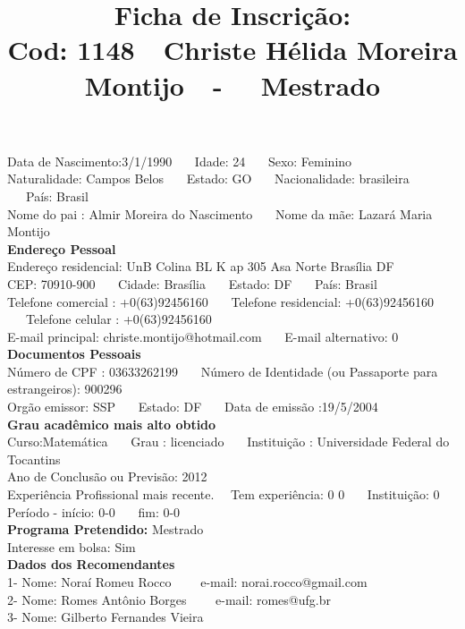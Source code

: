 \documentclass[11pt]{article}
\title{\vspace*{-4cm} Ficha de Inscrição: \\Cod: 1148\ \ Christe Hélida Moreira Montijo\ \ - \ \ Mestrado 
 }
\date{}
\begin{document}
\maketitle
\vspace*{-1.5cm}
\noindent Data de Nascimento:3/1/1990
\ \ \ Idade: 24   \ \ \ Sexo: Feminino
\\
Naturalidade: Campos Belos  
\ \ \  Estado: GO
\ \ \  Nacionalidade: brasileira
\ \ \ País: Brasil
\\        
Nome do pai : Almir Moreira do Nascimento
\ \ \ Nome da mãe: Lazará Maria Montijo          
\\[0.2cm]                     
\textbf{Endereço Pessoal} 
\\ 
\noindent Endereço residencial: UnB Colina BL K ap 305 Asa Norte Brasília DF
\\
        CEP: 70910-900 
\ \ \ Cidade: Brasília 
\ \ \ Estado: DF 
\ \ \ País: Brasil
\\		
		Telefone comercial : +0(63)92456160
\ \ \ Telefone residencial: +0(63)92456160
\ \ \ Telefone celular : +0(63)92456160
\\
E-mail principal: christe.montijo@hotmail.com
\ \ \ E-mail alternativo: 0 
\\[0.2cm] 
\textbf{Documentos Pessoais}
\\
\noindent Número de CPF : 03633262199
\ \ \ Número de Identidade (ou Passaporte para estrangeiros): 900296
\\
Orgão emissor: SSP
\ \ \ Estado: DF
\ \ \ Data de emissão :19/5/2004
\\[0.3cm]
\textbf{Grau acadêmico mais alto obtido}
\\	
Curso:Matemática
\ \ \ Grau : licenciado
\ \ \ Instituição : Universidade Federal do Tocantins
\\			
Ano de Conclusão ou Previsão: 2012
\\ 
Experiência Profissional mais recente. \ \  
Tem experiência: 0 0  
\ \ \ Instituição: 0
\\  
Período - início: 0-0
\ \ \ fim: 0-0
\\[0.2cm] 
\textbf{Programa Pretendido:} Mestrado\\
Interesse em bolsa: Sim
\\[0.3cm]		
\textbf{Dados dos Recomendantes} 
\\
1- Nome: Noraí Romeu Rocco
\ \ \ \  e-mail: norai.rocco@gmail.com 
\\
2- Nome: Romes Antônio Borges
\ \ \ \ e-mail: romes@ufg.br
\\
3- Nome: Gilberto Fernandes Vieira
\end{document}
